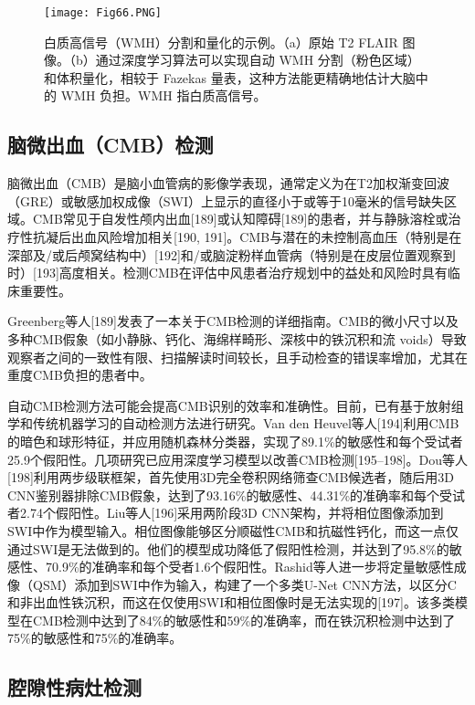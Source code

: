 \documentclass[11pt]{article}
\begin{document}
\begin{figure}[!htb]
	\centering
	\texttt{[image: Fig66.PNG]}
	\caption{\kaishu 白质高信号（WMH）分割和量化的示例。（a）原始 T2 FLAIR 图像。（b）通过深度学习算法可以实现自动 WMH 分割（粉色区域）和体积量化，相较于 Fazekas 量表，这种方法能更精确地估计大脑中的 WMH 负担。WMH 指白质高信号。}
	\label{Fig6}
\end{figure}

\subsection{\kaishu 脑微出血（CMB）检测}

脑微出血（CMB）是脑小血管病的影像学表现，通常定义为在T2加权渐变回波（GRE）或敏感加权成像（SWI）上显示的直径小于或等于10毫米的信号缺失区域。CMB常见于自发性颅内出血[189]或认知障碍[189]的患者，并与静脉溶栓或治疗性抗凝后出血风险增加相关[190, 191]。CMB与潜在的未控制高血压（特别是在深部及/或后颅窝结构中）[192]和/或脑淀粉样血管病（特别是在皮层位置观察到时）[193]高度相关。检测CMB在评估中风患者治疗规划中的益处和风险时具有临床重要性。

Greenberg等人[189]发表了一本关于CMB检测的详细指南。CMB的微小尺寸以及多种CMB假象（如小静脉、钙化、海绵样畸形、深核中的铁沉积和流 voids）导致观察者之间的一致性有限、扫描解读时间较长，且手动检查的错误率增加，尤其在重度CMB负担的患者中。

自动CMB检测方法可能会提高CMB识别的效率和准确性。目前，已有基于放射组学和传统机器学习的自动检测方法进行研究。Van den Heuvel等人[194]利用CMB的暗色和球形特征，并应用随机森林分类器，实现了89.1\%的敏感性和每个受试者25.9个假阳性。几项研究已应用深度学习模型以改善CMB检测[195–198]。Dou等人[198]利用两步级联框架，首先使用3D完全卷积网络筛查CMB候选者，随后用3D CNN鉴别器排除CMB假象，达到了93.16\%的敏感性、44.31\%的准确率和每个受试者2.74个假阳性。Liu等人[196]采用两阶段3D CNN架构，并将相位图像添加到SWI中作为模型输入。相位图像能够区分顺磁性CMB和抗磁性钙化，而这一点仅通过SWI是无法做到的。他们的模型成功降低了假阳性检测，并达到了95.8\%的敏感性、70.9\%的准确率和每个受者1.6个假阳性。Rashid等人进一步将定量敏感性成像（QSM）添加到SWI中作为输入，构建了一个多类U-Net CNN方法，以区分C和非出血性铁沉积，而这在仅使用SWI和相位图像时是无法实现的[197]。该多类模型在CMB检测中达到了84\%的敏感性和59\%的准确率，而在铁沉积检测中达到了75\%的敏感性和75\%的准确率。

\subsection{\kaishu 腔隙性病灶检测}
\end{document}
